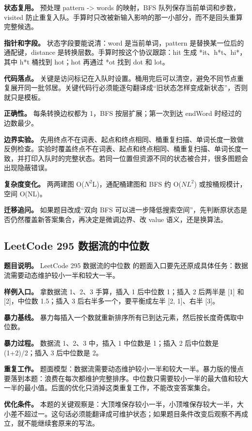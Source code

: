 \textbf{状态复用。} 预处理 pattern -> words 的映射，BFS 队列保存当前单词和步数，visited 防止重复入队。手算时只改被新输入影响的那一小部分，而不是回头重算完整候选。

\textbf{指针和字段。} 状态字段要能说清：word 是当前单词，pattern 是替换某一位后的通配键，distance 是转换层数。手算时按这个协议跟踪：hit 生成 *it、h*t、hi*，其中 h*t 桶找到 hot；hot 再通过 *ot 找到 dot 和 lot。

\textbf{代码落点。} 关键是访问标记在入队时设置。桶用完后可以清空，避免不同节点重复展开同一批邻居。关键代码行必须能逐句翻译成“旧状态怎样变成新状态”，否则就只是模板。

\textbf{正确性。} 每条转换边权都为 1，BFS 按层扩展；第一次到达 endWord 时经过的边数最少。

\textbf{边界实验。} 先用终点不在词表、起点和终点相同、桶重复扫描、单词长度一致做反例检查。实验时覆盖终点不在词表、起点和终点相同、桶重复扫描、单词长度一致，并打印入队时的完整状态。若同一位置但资源不同的状态被合并，很多图题会出现隐蔽错误。

\textbf{复杂度变化。} 两两建图 O(\ensuremath{N^{2}}L)，通配桶建图和 BFS 约 O(\ensuremath{NL^{2}}) 或按桶规模计，空间 O(NL)。

\textbf{迁移追问。} 如果题目改成“双向 BFS 可以进一步降低搜索空间”，先判断原状态是否仍然覆盖新答案集合，再决定是微调边界、改 value 语义，还是换算法。

\subsection{LeetCode 295 数据流的中位数}

\textbf{题目说明。} LeetCode 295 数据流的中位数 的题面入口要先还原成具体任务：数据流需要动态维护较小一半和较大一半。

\textbf{样例入口。} 拿数据流 1、2、3 手算，插入 1 后中位数 1；插入 2 后两半是 [1] 和 [2]，中位数 1.5；插入 3 后右半多一个，要平衡成左半 [2, 1]、右半 [3]。

\textbf{暴力基线。} 暴力每插入一个数就重新排序所有已到达元素，然后按长度奇偶取中位数。

\textbf{暴力过程。} 数据流 1、2、3 中，插入 1 中位数是 1；插入 2 后中位数是 (1+2)/2；插入 3 后中位数是 2。

\textbf{重复工作。} 题面模型：数据流需要动态维护较小一半和较大一半。暴力版的慢点要落到本题：浪费在每次都维护完整排序。中位数只需要较小一半的最大值和较大一半的最小值。后面的优化只消掉这类重复工作，不能改变答案集合。

\textbf{优化条件。} 本题的关键观察是：大顶堆保存较小一半，小顶堆保存较大一半，大小差不超过一。这句话必须能翻译成可维护状态；如果题目条件改变后观察不再成立，就不能继续套原来的写法。

